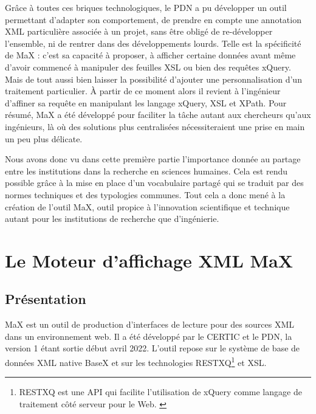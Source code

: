 \documentclass[a4paper,12pt,twoside]{book}
\begin{document}
    
    Grâce à toutes ces briques technologiques, le \acrshort{PDN} a pu développer un outil permettant d'adapter son comportement, de prendre en compte une annotation \acrshort{XML} particulière associée à un projet, sans être obligé de re-développer l'ensemble, ni de rentrer dans des développements lourds. Telle est la spécificité de MaX : c'est sa capacité à proposer, à afficher certaine données avant même d'avoir commencé à manipuler des feuilles \acrshort{XSL} ou bien des requêtes xQuery. Mais de tout aussi bien laisser la possibilité d'ajouter une personnalisation d'un traitement particulier. À partir de ce moment alors il revient à l'ingénieur d'affiner sa requête en manipulant les langage xQuery, \acrshort{XSL} et XPath. Pour résumé, MaX a été développé pour faciliter la tâche autant aux chercheurs qu'aux ingénieurs, là où des solutions plus centralisées nécessiteraient une prise en main un peu plus délicate.
    
    
    Nous avons donc vu dans cette première partie l'importance donnée au partage entre les institutions dans la recherche en sciences humaines. Cela est rendu possible grâce à la mise en place d'un vocabulaire partagé qui se traduit par des normes techniques et des typologies communes. Tout cela a donc mené à la création de l'outil MaX, outil propice à l'innovation scientifique et technique autant pour les institutions de recherche que d'ingénierie.
    
\part{Le Moteur d'affichage XML MaX}
    
\chapter{Présentation}
MaX est un outil de production d'interfaces de lecture pour des sources \acrshort{XML} dans un environnement web. Il a été développé par le \acrfull{CERTIC} et le \acrshort{PDN}, la version 1 étant sortie début avril 2022. L'outil repose sur le système de base de données \acrshort{XML} native BaseX et sur les technologies RESTXQ\footnote{RESTXQ est une API qui facilite l'utilisation de xQuery comme langage de traitement côté serveur pour le Web. \cite{xquery}} et XSL.
\end{document}
